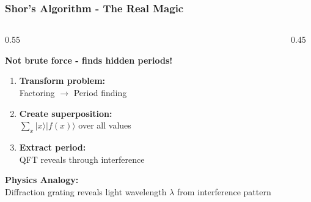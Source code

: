 \documentclass[aspectratio=169,10pt]{beamer}
\newcommand{\slideheader}[1]{\frametitle{#1}}
\theoremstyle{plain}
\begin{document}
\begin{frame}
  \slideheader{Shor's Algorithm - The Real Magic}
  
  \begin{columns}[T]
    \begin{column}{0.55\textwidth}

    \begin{center}
      \textbf{\large Not brute force - finds hidden periods!}
    \end{center}
    
    \vspace{0.3cm}
    
    \begin{enumerate}
      \item \textbf{Transform problem:}\\
        Factoring $\rightarrow$ Period finding
        
      \item \textbf{Create superposition:}\\
        $\sum_x |x\rangle|f(x)\rangle$ over all values
        
      \item \textbf{Extract period:}\\
        QFT reveals through interference
    \end{enumerate}
    
    \vspace{0.5cm}
    
    \begin{greenBox}
      \textbf{Physics Analogy:}\\
      Diffraction grating reveals light wavelength $\lambda$ from interference pattern
    \end{greenBox}
  
    \end{column}
    \begin{column}{0.45\textwidth}

\end{column}
\end{columns}
\end{frame}
\end{document}

